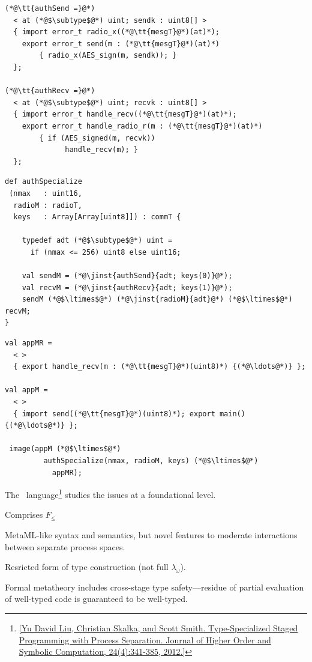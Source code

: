 
\begin{lstlisting}[language=nesC]
(*@\tt{authSend =}@*)
  < at (*@$\subtype$@*) uint; sendk : uint8[] >  
  { import error_t radio_x((*@\tt{mesgT}@*)(at)*);
    export error_t send(m : (*@\tt{mesgT}@*)(at)*) 
        { radio_x(AES_sign(m, sendk)); }
  };

(*@\tt{authRecv =}@*)
  < at (*@$\subtype$@*) uint; recvk : uint8[] >  
  { import error_t handle_recv((*@\tt{mesgT}@*)(at)*);
    export error_t handle_radio_r(m : (*@\tt{mesgT}@*)(at)*) 
        { if (AES_signed(m, recvk))
              handle_recv(m); }
  };
\end{lstlisting}
\stopslide


\begin{lstlisting}[language=scalaness]
def authSpecialize
 (nmax   : uint16,
  radioM : radioT,
  keys   : Array[Array[uint8]]) : commT {

    typedef adt (*@$\subtype$@*) uint =
      if (nmax <= 256) uint8 else uint16;

    val sendM = (*@\jinst{authSend}{adt; keys(0)}@*);
    val recvM = (*@\jinst{authRecv}{adt; keys(1)}@*);
    sendM (*@$\ltimes$@*) (*@\jinst{radioM}{adt}@*) (*@$\ltimes$@*) recvM;
}
\end{lstlisting}
\stopslide


\begin{lstlisting}[language=scalaness]
val appMR =
  < >
  { export handle_recv(m : (*@\tt{mesgT}@*)(uint8)*) {(*@\ldots@*)} }; 

val appM = 
  < >
  { import send((*@\tt{mesgT}@*)(uint8)*); export main() {(*@\ldots@*)} };  

 image(appM (*@$\ltimes$@*)
         authSpecialize(nmax, radioM, keys) (*@$\ltimes$@*)
           appMR);
\end{lstlisting}
\stopslide


 The \fml\ language\footnote{\cref{Yu David Liu, Christian Skalka,
    and Scott Smith. Type-Specialized Staged Programming with Process Separation. Journal of
    Higher Order and Symbolic Computation, 24(4):341-385, 2012.}} studies the issues at a
foundational level.
\begin{citemize}
\item Comprises $F_{\le}$
\item MetaML-like syntax and semantics, but novel features to moderate interactions between
  separate process spaces.
\item Resricted form of type construction (not full $\lambda_\omega$).
\item Formal metatheory includes cross-stage type safety---residue of partial evaluation of
  well-typed code is guaranteed to be well-typed.
\end{citemize}
\stopslide

